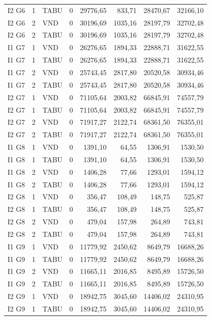 \begin{longtable}{lrlrrrrr}
I2 G6 & 1 & TABU & 0 & 29776,65 & 833,71 & 28470,67 & 32166,10 \\
I2 G6 & 2 & VND & 0 & 30196,69 & 1035,16 & 28197,79 & 32702,48 \\
I2 G6 & 2 & TABU & 0 & 30196,69 & 1035,16 & 28197,79 & 32702,48 \\
I1 G7 & 1 & VND & 0 & 26276,65 & 1894,33 & 22888,71 & 31622,55 \\
I1 G7 & 1 & TABU & 0 & 26276,65 & 1894,33 & 22888,71 & 31622,55 \\
I1 G7 & 2 & VND & 0 & 25743,45 & 2817,80 & 20520,58 & 30934,46 \\
I1 G7 & 2 & TABU & 0 & 25743,45 & 2817,80 & 20520,58 & 30934,46 \\
I2 G7 & 1 & VND & 0 & 71105,64 & 2003,82 & 66845,91 & 74557,79 \\
I2 G7 & 1 & TABU & 0 & 71105,64 & 2003,82 & 66845,91 & 74557,79 \\
I2 G7 & 2 & VND & 0 & 71917,27 & 2122,74 & 68361,50 & 76355,01 \\
I2 G7 & 2 & TABU & 0 & 71917,27 & 2122,74 & 68361,50 & 76355,01 \\
I1 G8 & 1 & VND & 0 & 1391,10 & 64,55 & 1306,91 & 1530,50 \\
I1 G8 & 1 & TABU & 0 & 1391,10 & 64,55 & 1306,91 & 1530,50 \\
I1 G8 & 2 & VND & 0 & 1406,28 & 77,66 & 1293,01 & 1594,12 \\
I1 G8 & 2 & TABU & 0 & 1406,28 & 77,66 & 1293,01 & 1594,12 \\
I2 G8 & 1 & VND & 0 & 356,47 & 108,49 & 148,75 & 525,87 \\
I2 G8 & 1 & TABU & 0 & 356,47 & 108,49 & 148,75 & 525,87 \\
I2 G8 & 2 & VND & 0 & 479,04 & 157,98 & 264,89 & 743,81 \\
I2 G8 & 2 & TABU & 0 & 479,04 & 157,98 & 264,89 & 743,81 \\
I1 G9 & 1 & VND & 0 & 11779,92 & 2450,62 & 8649,79 & 16688,26 \\
I1 G9 & 1 & TABU & 0 & 11779,92 & 2450,62 & 8649,79 & 16688,26 \\
I1 G9 & 2 & VND & 0 & 11665,11 & 2016,85 & 8495,89 & 15726,50 \\
I1 G9 & 2 & TABU & 0 & 11665,11 & 2016,85 & 8495,89 & 15726,50 \\
I2 G9 & 1 & VND & 0 & 18942,75 & 3045,60 & 14406,02 & 24310,95 \\
I2 G9 & 1 & TABU & 0 & 18942,75 & 3045,60 & 14406,02 & 24310,95 \\

\end{longtable}
